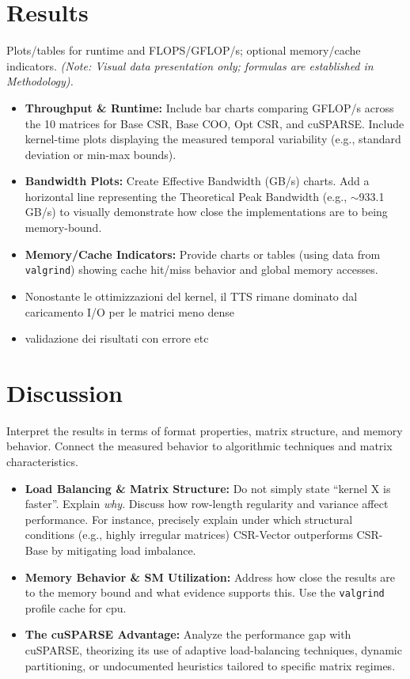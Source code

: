 \documentclass[conference]{IEEEtran}
\begin{document}
\section{Results}
Plots/tables for runtime and FLOPS/GFLOP/s; optional memory/cache indicators. \textit{(Note: Visual data presentation only; formulas are established in Methodology).}
\begin{itemize}
    \item \textbf{Throughput \& Runtime:} Include bar charts comparing GFLOP/s across the 10 matrices for Base CSR, Base COO, Opt CSR, and cuSPARSE. Include kernel-time plots displaying the measured temporal variability (e.g., standard deviation or min-max bounds).
    \item \textbf{Bandwidth Plots:} Create Effective Bandwidth (GB/s) charts. Add a horizontal line representing the Theoretical Peak Bandwidth (e.g., $\sim$933.1 GB/s) to visually demonstrate how close the implementations are to being memory-bound.
    \item \textbf{Memory/Cache Indicators:} Provide charts or tables (using data from \texttt{valgrind}) showing cache hit/miss behavior and global memory accesses.
    \item Nonostante le ottimizzazioni del kernel, il TTS rimane dominato dal caricamento I/O per le matrici meno dense
    \item validazione dei risultati con errore etc
\end{itemize}

\section{Discussion}
Interpret the results in terms of format properties, matrix structure, and memory behavior. Connect the measured behavior to algorithmic techniques and matrix characteristics.
\begin{itemize}
    \item \textbf{Load Balancing \& Matrix Structure:} Do not simply state ``kernel X is faster''. Explain \textit{why}. Discuss how row-length regularity and variance affect performance. For instance, precisely explain under which structural conditions (e.g., highly irregular matrices) CSR-Vector outperforms CSR-Base by mitigating load imbalance.
    \item \textbf{Memory Behavior \& SM Utilization:} Address how close the results are to the memory bound and what evidence supports this. Use the \texttt{valgrind} profile cache for cpu.
    \item \textbf{The cuSPARSE Advantage:} Analyze the performance gap with cuSPARSE, theorizing its use of adaptive load-balancing techniques, dynamic partitioning, or undocumented heuristics tailored to specific matrix regimes.
\end{itemize}
\end{document}
